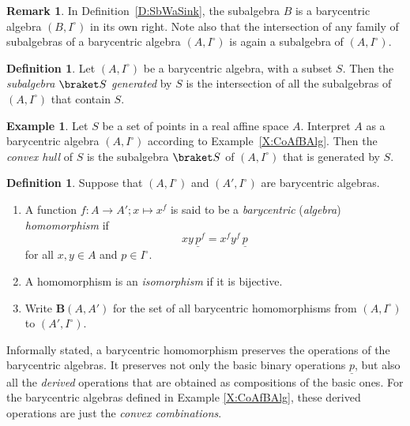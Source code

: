 \documentclass[12pt]{amsart}
\theoremstyle{plain}
\theoremstyle{definition}
\newtheorem{definition}[theorem]{Definition}
\newtheorem{remark}[theorem]{Remark}
\newtheorem{example}[theorem]{Example}
\numberwithin{equation}{section}
\begin{document}
\begin{remark}\label{R:SbWaSink}
In Definition~\ref{D:SbWaSink}, the subalgebra $B$ is a barycentric algebra $(B,I^\circ)$ in its own right. Note also that the intersection of any family of subalgebras of a barycentric algebra $(A,I^\circ)$ is again a subalgebra of $(A,I^\circ)$.
\end{remark}

\begin{definition}
Let $(A,I^\circ)$ be a barycentric algebra, with a subset $S$. Then the \emph{subalgebra} $\braket S$ \emph{generated} by $S$ is the intersection of all the subalgebras of $(A,I^\circ)$ that contain $S$.
\end{definition}

\begin{example}
Let $S$ be a set of points in a real affine space $A$. Interpret $A$ as a barycentric algebra $(A,I^\circ)$ according to Example~\ref{X:CoAfBAlg}. Then the \emph{convex hull} of $S$ is the subalgebra $\braket S$ of $(A,I^\circ)$ that is generated by $S$.
\end{example}

\begin{definition}\label{D:BaHomSet}
Suppose that $(A,I^\circ)$ and $(A',I^\circ)$ are barycentric algebras.
\begin{enumerate}
\item[$(\mathrm a)$]
A function $f\colon A\to A';x\mapsto x^f$ is said to be a \emph{barycentric} (\emph{algebra}) \emph{homomorphism} if
\begin{equation}\label{E:BaryAHom}
xy\,\underline p^f=x^fy^f\,\underline p
\end{equation}
for all $x,y\in A$ and $p\in I^\circ$.
\item[$(\mathrm b)$]
A homomorphism is an \emph{isomorphism} if it is bijective.
\item[$(\mathrm c)$]
Write $\mathbf B(A,A')$ for the set of all barycentric homomorphisms from $(A,I^\circ)$ to $(A',I^\circ)$.
\end{enumerate}
\end{definition}

Informally stated, a barycentric homomorphism preserves the operations of the barycentric algebras. It preserves not only the basic binary operations $\underline{p}$, but also all the \emph{derived} operations that are obtained as compositions of the basic ones. For the barycentric algebras defined in Example \ref{X:CoAfBAlg}, these derived operations are just the \emph{convex combinations}.
\end{document}
